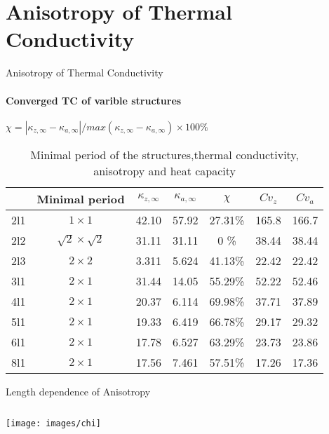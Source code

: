 \documentclass{beamer}
\begin{document}
\section{Anisotropy of Thermal Conductivity}
\begin{frame}{Anisotropy of Thermal Conductivity}
  \framesubtitle{Converged TC of varible structures}%
  $ \chi=|\kappa_{z,\infty}-\kappa_{a,\infty} |/max⁡(\kappa_{z,\infty}-\kappa_{a,\infty} ) \times 100 \%$
  \begin{table}[!b]
    {\carlitoTLF %
      \begin{tabular}{ccccccc}
            & Minimal period
            & $\kappa_{z,\infty}$
            & $\kappa_{a,\infty}$
            & $\chi$
            & $Cv_{z}$
            & $Cv_{a}$                                                           \\
        \toprule
        2l1 & $1 \times 1$             & 42.10 & 57.92 & 27.31\% & 165.8 & 166.7 \\
        2l2 & $\sqrt{2}\times\sqrt{2}$ & 31.11 & 31.11 & 0    \% & 38.44 & 38.44 \\
        2l3 & $2 \times 2$             & 3.311 & 5.624 & 41.13\% & 22.42 & 22.42 \\
        3l1 & $2 \times 1$             & 31.44 & 14.05 & 55.29\% & 52.22 & 52.46 \\
        4l1 & $2 \times 1$             & 20.37 & 6.114 & 69.98\% & 37.71 & 37.89 \\
        5l1 & $2 \times 1$             & 19.33 & 6.419 & 66.78\% & 29.17 & 29.32 \\
        6l1 & $2 \times 1$             & 17.78 & 6.527 & 63.29\% & 23.73 & 23.86 \\
        8l1 & $2 \times 1$             & 17.56 & 7.461 & 57.51\% & 17.26 & 17.36 \\
        \bottomrule
      \end{tabular}
    }

    \caption{
      Minimal period of the structures,thermal conductivity, anisotropy and heat capacity}
  \end{table}

\end{frame}


\begin{frame}{Length dependence of Anisotropy}
  \small
  \begin{columns}[onlytextwidth]
    \column{\textwidth}
    \texttt{[image: images/chi]}


  \end{columns}

\end{frame}
\end{document}
